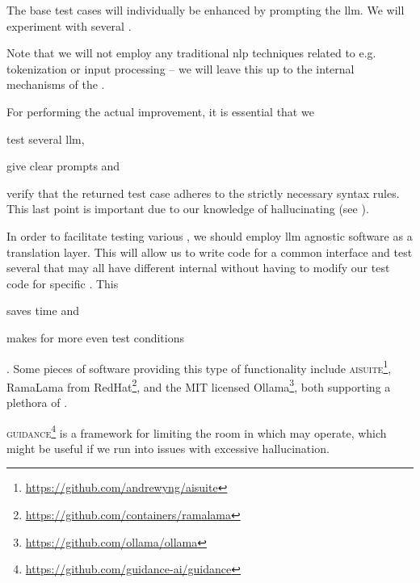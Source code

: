 The base test cases will individually be enhanced by prompting the
\acrshort{llm}. We will experiment with several .

Note that we will not employ any traditional \acrfull{nlp} techniques related to e.g. tokenization
or input processing -- we will leave this up to the internal mechanisms of the .

For performing the actual improvement, it is essential that we \begin{inparaenum}
    \item test several \acrshort{llm},
    \item give clear prompts
    and
    \item verify that the returned test case adheres to the strictly necessary
    syntax rules. This last point is important due to our knowledge of
     hallucinating (see ).
\end{inparaenum}

In order to facilitate testing various , we should employ
\acrshort{llm} agnostic software as a translation layer. This will allow us to
write code for a common interface and test several  that may all
have different internal  without having to modify our test code
for specific . This \begin{inparaenum}
    \item saves time
    and
    \item makes for more even test conditions \end{inparaenum}. Some pieces of software providing
this type of functionality include
\textsc{aisuite}\footnote{\url{https://github.com/andrewyng/aisuite}}, RamaLama from
RedHat\footnote{\url{https://github.com/containers/ramalama}}, and the MIT licensed
Ollama\footnote{\url{https://github.com/ollama/ollama}}, both supporting a plethora of
.

\textsc{guidance}\footnote{\url{https://github.com/guidance-ai/guidance}} is a
framework for limiting the room in which  may operate, which
might be useful if we run into issues with excessive hallucination.


